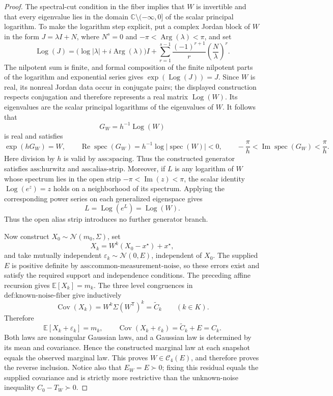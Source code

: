 \documentclass{article}
\begin{document}
\begin{proof}
The spectral-cut condition in the fiber implies that \(W\) is invertible and that every eigenvalue lies in the domain \(\mathbb C\setminus(-\infty,0]\) of the scalar principal logarithm.  To make the logarithm step explicit, put a complex Jordan block of \(W\) in the form \(J=\lambda I+N\), where \(N^s=0\) and \(-\pi<\operatorname{Arg}(\lambda)<\pi\), and set
\[
 \operatorname{Log}(J)
 =\bigl(\log|\lambda|+i\operatorname{Arg}(\lambda)\bigr)I
  +\sum_{r=1}^{s-1}\frac{(-1)^{r+1}}{r}\left(\frac{N}{\lambda}\right)^r.
\]
The nilpotent sum is finite, and formal composition of the finite nilpotent parts of the logarithm and exponential series gives \(\exp(\operatorname{Log}(J))=J\).  Since \(W\) is real, its nonreal Jordan data occur in conjugate pairs; the displayed construction respects conjugation and therefore represents a real matrix \(\operatorname{Log}(W)\).  Its eigenvalues are the scalar principal logarithms of the eigenvalues of \(W\).  It follows that
\[
 G_W=h^{-1}\operatorname{Log}(W)
\]
is real and satisfies
\[
 \exp(hG_W)=W,
 \qquad
 \operatorname{Re}\operatorname{spec}(G_W)
 =h^{-1}\log|\operatorname{spec}(W)|<0,
 \qquad
 -\frac{\pi}{h}<\operatorname{Im}\operatorname{spec}(G_W)<\frac{\pi}{h}.
\]
Here division by \(h\) is valid by \(\text{ass:spacing}\).  Thus the constructed generator satisfies \(\text{ass:hurwitz}\) and \(\text{ass:alias-strip}\).  Moreover, if \(L\) is any logarithm of \(W\) whose spectrum lies in the open strip \(-\pi<\operatorname{Im}(z)<\pi\), the scalar identity \(\operatorname{Log}(e^z)=z\) holds on a neighborhood of its spectrum.  Applying the corresponding power series on each generalized eigenspace gives
\[
 L=\operatorname{Log}(e^L)=\operatorname{Log}(W).
\]
Thus the open alias strip introduces no further generator branch.

Now construct \(X_0\sim\mathcal N(m_0,\Sigma)\), set
\[
 X_k=W^k(X_0-x^\star)+x^\star,
\]
and take mutually independent \(\varepsilon_k\sim\mathcal N(0,E)\), independent of \(X_0\).  The supplied \(E\) is positive definite by \(\text{ass:common-measurement-noise}\), so these errors exist and satisfy the required support and independence conditions.  The preceding affine recursion gives \(\mathbb E[X_k]=m_k\).  The three level congruences in \(\text{def:known-noise-fiber}\) give inductively
\[
 \operatorname{Cov}(X_k)
 =W^k\Sigma(W^{\mathsf T})^k
 =\widetilde C_k
 \qquad(k\in K).
\]
Therefore
\[
 \mathbb E[X_k+\varepsilon_k]=m_k,
 \qquad
 \operatorname{Cov}(X_k+\varepsilon_k)=\widetilde C_k+E=C_k.
\]
Both laws are nonsingular Gaussian laws, and a Gaussian law is determined by its mean and covariance.  Hence the constructed marginal law at each snapshot equals the observed marginal law.  This proves \(W\in\mathcal C_4(E)\), and therefore proves the reverse inclusion.  Notice also that \(E_W=E\succ0\); fixing this residual equals the supplied covariance and is strictly more restrictive than the unknown-noise inequality \(C_0-T_W\succ0\).


\end{proof}
\end{document}
